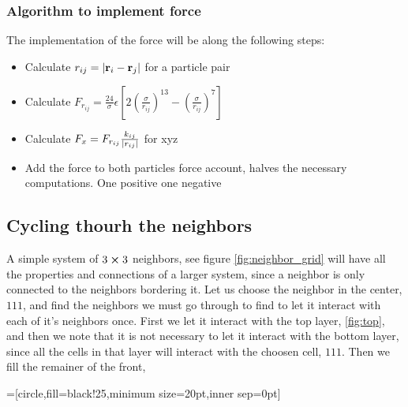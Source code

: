 \documentclass[11pt]{article}
\begin{document}
	\subsubsection{Algorithm to implement force}
		The implementation of the force will be along the following steps:
		\begin{itemize}
		\item Calculate \(r_{ij} = \abs{\vb{r}_i - \vb{r}_j}\) for a particle pair
		\item Calculate \(F_{r_{ij}} =  \frac{24}{\sigma} \epsilon \left[ 2  \left( \frac{\sigma}{r_{ij}}  \right)^{13} 
		- \left( \frac{\sigma}{r_{ij}} \right)^{7} \right]\)
		\item Calculate \(F_x = F_{r_{ij}} \frac{k_{ij}}{\abs{r_{ij}}} \) for xyz
		\item Add the force to both particles force account, halves the necessary computations. One positive one negative
		\end{itemize}

	\subsection{Cycling thourh the neighbors}
	A simple system of \(3\cross 3\) neighbors, see figure \ref{fig:neighbor_grid} will have all the properties and connections of a larger system, since a neighbor is only connected to the neighbors bordering it. Let us choose the neighbor in the center, \(111\),  and find the neighbors we must go through to find to let it interact with each of it's neighbors once. First we let it interact with the top layer, \ref{fig:top}, and then we note that it is not necessary to let it interact with the bottom layer, since all the cells in that layer will interact with the choosen cell, \(111\). Then we fill the remainer of the front, 

	=[circle,fill=black!25,minimum size=20pt,inner sep=0pt]
\end{document}
